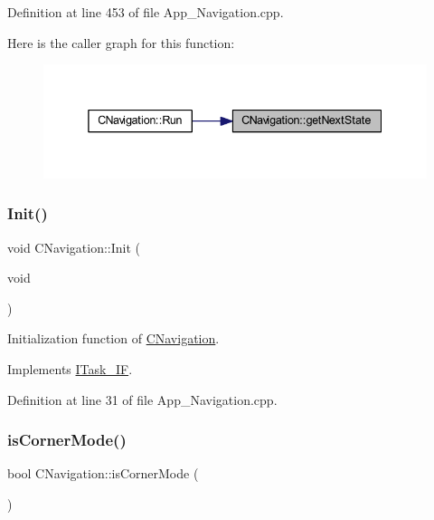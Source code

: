 Definition at line 453 of file App\+\_\+\+Navigation.\+cpp.

Here is the caller graph for this function\+:\nopagebreak
\begin{figure}[H]
\begin{center}
\leavevmode
\includegraphics[width=338pt]{class_c_navigation_afef253f37646558a755d956ecf2fc6e9_icgraph}
\end{center}
\end{figure}
\mbox{\label{class_c_navigation_a86a0756663ccf76e9c474764b8f7a04f}} 
\subsubsection{\texorpdfstring{Init()}{Init()}}
{\footnotesize\ttfamily void C\+Navigation\+::\+Init (\begin{DoxyParamCaption}\item[{void}]{ }\end{DoxyParamCaption})\hspace{0.3cm}{\ttfamily [virtual]}}



Initialization function of \mbox{\hyperlink{class_c_navigation}{C\+Navigation}}. 



Implements \mbox{\hyperlink{class_i_task___i_f_a28f608bdb9b19658403f7b9b7421968d}{I\+Task\+\_\+\+IF}}.



Definition at line 31 of file App\+\_\+\+Navigation.\+cpp.

\mbox{\label{class_c_navigation_aa984fc062deefed13a85d866d997de73}} 
\subsubsection{\texorpdfstring{isCornerMode()}{isCornerMode()}}
{\footnotesize\ttfamily bool C\+Navigation\+::is\+Corner\+Mode (\begin{DoxyParamCaption}{ }\end{DoxyParamCaption})}




